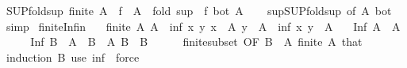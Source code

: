 \begin{isabellebody}
{\isafoldproof}%
%
\isadelimproof
\isanewline
%
\endisadelimproof
\isanewline
{}\isamarkupfalse%
\ SUP{\isacharunderscore}{\kern0pt}fold{\isacharunderscore}{\kern0pt}sup{\isacharcolon}{\kern0pt}\ {\isachardoublequoteopen}finite\ A\ {\isasymLongrightarrow}\ {\isasymSqunion}{\isacharparenleft}{\kern0pt}f\ {\isacharbackquote}{\kern0pt}\ A{\isacharparenright}{\kern0pt}\ {\isacharequal}{\kern0pt}\ fold\ {\isacharparenleft}{\kern0pt}sup\ {\isasymcirc}\ f{\isacharparenright}{\kern0pt}\ bot\ A{\isachardoublequoteclose}\isanewline
%
\isadelimproof
\ \ %
\endisadelimproof
%
\isatagproof
{}\isamarkupfalse%
\ sup{\isacharunderscore}{\kern0pt}SUP{\isacharunderscore}{\kern0pt}fold{\isacharunderscore}{\kern0pt}sup\ {\isacharbrackleft}{\kern0pt}of\ A\ bot{\isacharbrackright}{\kern0pt}\ \isamarkupfalse%
\ simp%
\endisatagproof
{\isafoldproof}%
%
\isadelimproof
\isanewline
%
\endisadelimproof
\isanewline
{}\isamarkupfalse%
\ finite{\isacharunderscore}{\kern0pt}Inf{\isacharunderscore}{\kern0pt}in{\isacharcolon}{\kern0pt}\isanewline
\ \ \ {\isachardoublequoteopen}finite\ A{\isachardoublequoteclose}\ {\isachardoublequoteopen}A{\isasymnoteq}{\isacharbraceleft}{\kern0pt}{\isacharbraceright}{\kern0pt}{\isachardoublequoteclose}\ \ inf{\isacharcolon}{\kern0pt}\ {\isachardoublequoteopen}{\isasymAnd}x\ y{\isachardot}{\kern0pt}\ {\isasymlbrakk}x\ {\isasymin}\ A{\isacharsemicolon}{\kern0pt}\ y\ {\isasymin}\ A{\isasymrbrakk}\ {\isasymLongrightarrow}\ inf\ x\ y\ {\isasymin}\ A{\isachardoublequoteclose}\isanewline
\ \ \ {\isachardoublequoteopen}Inf\ A\ {\isasymin}\ A{\isachardoublequoteclose}\isanewline
%
\isadelimproof
%
\endisadelimproof
%
\isatagproof
{}\isamarkupfalse%
\ {\isacharminus}{\kern0pt}\isanewline
\ \ \isamarkupfalse%
\ {\isachardoublequoteopen}Inf\ B\ {\isasymin}\ A{\isachardoublequoteclose}\ \ {\isachardoublequoteopen}B\ {\isasymle}\ A{\isachardoublequoteclose}\ {\isachardoublequoteopen}B{\isasymnoteq}{\isacharbraceleft}{\kern0pt}{\isacharbraceright}{\kern0pt}{\isachardoublequoteclose}\ \ B\isanewline
\ \ \ \ \isamarkupfalse%
\ finite{\isacharunderscore}{\kern0pt}subset\ {\isacharbrackleft}{\kern0pt}OF\ {\isacartoucheopen}B\ {\isasymsubseteq}\ A{\isacartoucheclose}\ {\isacartoucheopen}finite\ A{\isacartoucheclose}{\isacharbrackright}{\kern0pt}\ that\isanewline
\ \ \isamarkupfalse%
\ {\isacharparenleft}{\kern0pt}induction\ B{\isacharparenright}{\kern0pt}\ {\isacharparenleft}{\kern0pt}use\ inf\ \ {\isacartoucheopen}force{\isacharplus}{\kern0pt}{\isacartoucheclose}{\isacharparenright}{\kern0pt}\isanewline

\end{isabellebody}
